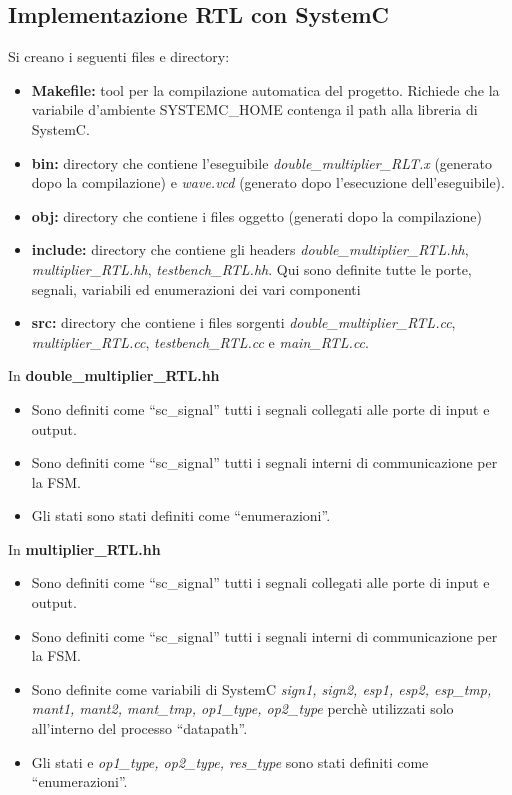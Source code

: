 \documentclass[]{IEEEtran}
\begin{document}
\subsection{Implementazione RTL con SystemC}
Si creano i seguenti files e directory:
\begin{itemize}
    \item \textbf{Makefile:} tool per la compilazione automatica del progetto. Richiede che la variabile d'ambiente SYSTEMC\_HOME contenga il path alla libreria di SystemC.
    \item \textbf{bin:} directory che contiene l'eseguibile \textit{double\_multiplier\_RLT.x} (generato dopo la compilazione) e \textit{wave.vcd} (generato dopo l'esecuzione dell'eseguibile).
    \item \textbf{obj:} directory che contiene i files oggetto (generati dopo la compilazione)
    \item \textbf{include:} directory che contiene gli headers \textit{double\_multiplier\_RTL.hh}, \textit{multiplier\_RTL.hh}, \textit{testbench\_RTL.hh}. Qui sono definite tutte le porte, segnali, variabili ed enumerazioni dei vari componenti
    \item \textbf{src:} directory che contiene i files sorgenti \textit{double\_multiplier\_RTL.cc}, \textit{multiplier\_RTL.cc}, \textit{testbench\_RTL.cc} e \textit{main\_RTL.cc}.
\end{itemize}
In \textbf{double\_multiplier\_RTL.hh}
\begin{itemize}
    \item Sono definiti come ``sc\_signal'' tutti i segnali collegati alle porte di input e output.
    \item Sono definiti come ``sc\_signal'' tutti i segnali interni di communicazione per la FSM.
    \item Gli stati sono stati definiti come ``enumerazioni''.
\end{itemize}
In \textbf{multiplier\_RTL.hh}
\begin{itemize}
    \item Sono definiti come ``sc\_signal'' tutti i segnali collegati alle porte di input e output.
    \item Sono definiti come ``sc\_signal'' tutti i segnali interni di communicazione per la FSM.
    \item Sono definite come variabili di SystemC \textit{sign1, sign2, esp1, esp2, esp\_tmp, mant1, mant2, mant\_tmp, op1\_type, op2\_type} perchè utilizzati solo all'interno del processo ``datapath''.
    \item Gli stati e \textit{op1\_type, op2\_type, res\_type} sono stati definiti come ``enumerazioni''.
\end{itemize}
\end{document}
